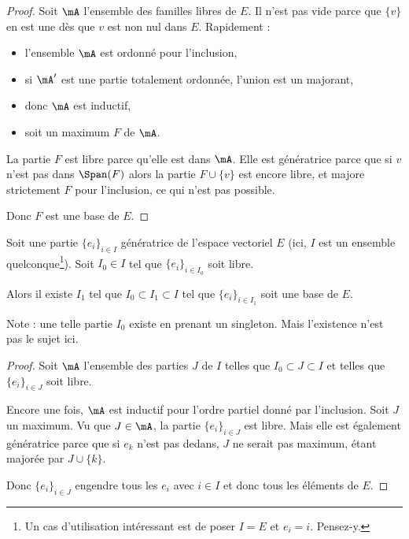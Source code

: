 \begin{proof}
    Soit \( \mA\) l'ensemble des familles libres de \( E\). Il n'est pas vide parce que \( \{ v \}\) en est une dès que \( v\) est non nul dans \( E\). Rapidement :
    \begin{itemize}
        \item l'ensemble \( \mA\) est ordonné pour l'inclusion,
        \item si \( \mA'\) est une partie totalement ordonnée, l'union est un majorant,
        \item donc \( \mA\) est inductif,
        \item soit un maximum \( F\) de \( \mA\).
    \end{itemize}
    La partie \( F\) est libre parce qu'elle est dans \( \mA\). Elle est génératrice parce que si \( v\) n'est pas dans \( \Span(F)\) alors la partie \( F\cup\{ v \}\) est encore libre, et majore strictement $F$ pour l'inclusion, ce qui n'est pas possible.

    Donc \( F\) est une base de \( E\).
\end{proof}

\begin{theorem}      \label{THOooOQLQooHqEeDK}
    Soit une partie \( \{ e_i \}_{i\in I}\) génératrice de l'espace vectoriel \( E\) (ici, \( I\) est un ensemble quelconque\footnote{Un cas d'utilisation intéressant est de poser \( I=E\) et \( e_i=i\). Pensez-y.}). Soit \( I_0\in I\) tel que \( \{ e_i \}_{i\in I_0}\) soit libre.

    Alors il existe \( I_1\) tel que \( I_0\subset I_1\subset I\) tel que \( \{ e_i \}_{i\in I_1}\) soit une base de \( E\).
\end{theorem}

Note : une telle partie \( I_0\) existe en prenant un singleton. Mais l'existence n'est pas le sujet ici.

\begin{proof}
    Soit \( \mA\) l'ensemble des parties \( J\) de \( I\) telles que \( I_0\subset J\subset I\) et telles que \( \{ e_i \}_{i\in J}\) soit libre.

    Encore une fois, \( \mA\) est inductif pour l'ordre partiel donné par l'inclusion. Soit \( J\) un maximum. Vu que \( J\in\mA\), la partie \( \{ e_i \}_{i\in J}\) est libre. Mais elle est également génératrice parce que si \( e_k\) n'est pas dedans, \( J\) ne serait pas maximum, étant majorée par \( J\cup\{ k \}\).

    Donc \( \{ e_i \}_{i\in J}\) engendre tous les \( e_i\) avec \( i\in I\) et donc tous les éléments de \( E\).
\end{proof}


